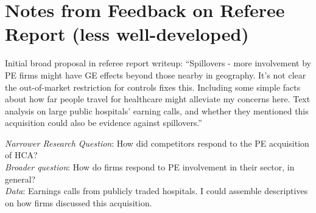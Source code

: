 \documentclass[11pt]{article}
\begin{document}




\newpage
\section{Notes from Feedback on Referee Report (less well-developed)}

Initial broad proposal in referee report writeup: ``Spillovers - more involvement by PE firms might have GE effects beyond those nearby in
geography. It’s not clear the out-of-market restriction for controls fixes this. Including some
simple facts about how far people travel for healthcare might alleviate my concerns here. Text
analysis on large public hospitals’ earning calls, and whether they mentioned this acquisition
could also be evidence against spillovers.''



\textit{Narrower Research Question}: How did competitors respond to the PE acquisition of HCA?\\
\textit{Broader question}: How do firms respond to PE involvement in their sector, in general?  \\
\textit{Data}: Earnings calls from publicly traded hospitals. I could assemble descriptives on how firms discussed this acquisition. 
\end{document}
